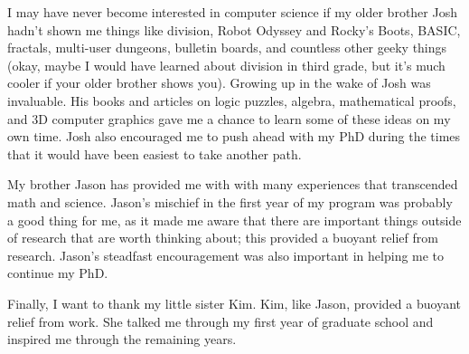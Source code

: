 I may have never become interested in computer science if my older
brother Josh hadn't shown me things like division, Robot Odyssey and
Rocky's Boots, BASIC, fractals, multi-user dungeons, bulletin boards,
and countless other geeky things (okay, maybe I would have learned
about division in third grade, but it's much cooler if your older
brother shows you).  Growing up in the wake of Josh was invaluable.
His books and articles on logic puzzles, algebra, mathematical proofs,
and 3D computer graphics gave me a chance to learn some of these ideas
on my own time.  Josh also encouraged me to push ahead with my PhD
during the times that it would have been easiest to take another path.

My brother Jason has provided me with with many experiences that
transcended math and science.  Jason's mischief in the first year of
my program was probably a good thing for me, as it made me aware
that there are important things outside of research that are worth
thinking about; this provided a buoyant relief from research.  Jason's
steadfast encouragement was also important in helping me to continue
my PhD.

Finally, I want to thank my little sister Kim.  Kim, like Jason,
provided a buoyant relief from work.  She talked me through my first
year of graduate school and inspired me through the remaining years.
